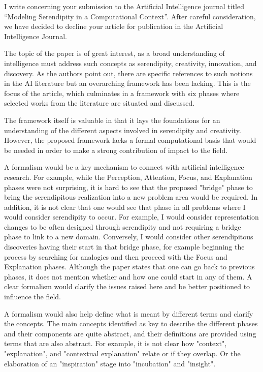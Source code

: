 \documentclass[natbib,a4paper,preprint,number,sort&compress,times]{elsarticle}
\begin{document}
\begin{frontmatter}

\iffalse
I write concerning your submission to the Artificial Intelligence journal titled “Modeling Serendipity in a Computational Context”.  After careful consideration, we have decided to decline your article for publication in the Artificial Intelligence Journal.  

The topic of the paper is of great interest, as a broad understanding of intelligence must address such concepts as serendipity, creativity, innovation, and discovery.  As the authors point out, there are specific references to such notions in the AI literature but an overarching framework has been lacking. This is the focus of the article, which culminates in a framework with six phases where selected works from the literature are situated and discussed.

The framework itself is valuable in that it lays the foundations for an understanding of the different aspects involved in serendipity and creativity.  However, the proposed framework lacks a formal computational basis that would be needed in order to make a strong contribution of impact to the field.  

A formalism would be a key mechanism to connect with artificial intelligence research.  For example, while the Perception, Attention, Focus, and Explanation phases were not surprising, it is hard to  see that the proposed "bridge" phase to bring the serendipitous realization into a new problem area would be required.  In addition, it is not clear that one would see that phase in all problems where I would consider serendipity to occur.  For example, I would consider representation changes to be often designed through serendipity and not requiring a bridge phase to link to a new domain.  Conversely, I would consider other serendipitous discoveries having their start in that bridge phase, for example beginning the process by searching for analogies and then proceed with the Focus and Explanation phases.  Although the paper states that one can go back to previous phases, it does not mention whether and how one could start in any of them.  A clear formalism would clarify the issues raised here and be better positioned to influence the field.

A formalism would also help define what is meant by different terms and clarify the concepts.  The main concepts identified as key to describe the different phases and their components are quite abstract, and their definitions are provided using terms that are also abstract.  For example, it is not clear how "context", "explanation", and "contextual explanation" relate or if they overlap.  Or the elaboration of an "inspiration" stage into "incubation" and "insight".


\end{frontmatter}
\end{document}
